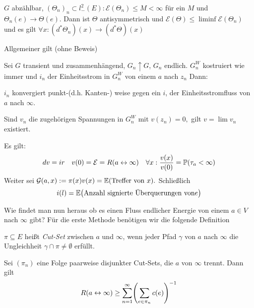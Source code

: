 \begin{uebung}
	$G$ abzählbar, $(\Theta_n)_n \subset l^2_-(E): \mathcal{E}(\Theta_n) \leq M < \infty$ für ein $M$ und $\Theta_n(e) \to \Theta(e)$. Dann ist $\Theta$ antisymmetrisch und $\mathcal{E}(\Theta) \leq \liminf \mathcal{E}(\Theta_n)$ und es gilt $ \forall x: (d^*\Theta_n)(x) \to (d^*\Theta)(x)$
\end{uebung}

Allgemeiner gilt (ohne Beweis)

\begin{satz}
	Sei $G$ transient und zusammenhängend, $G_n \uparrow G$, $G_n$ endlich. $G_n^W$ kostruiert wie immer und $i_n$ der Einheitsstrom in $G^W_n$ von einem $a$ nach $z_n$ Dann:
	
	$i_n$ konvergiert punkt-(d.h. Kanten-) weise gegen ein $i$, der Einheitsstromfluss von $a$ nach $\infty$.
	
	Sind $v_n$ die zugehörigen Spannungen in $G^W_n$ mit $v(z_n) = 0,$ gilt $v  = \lim v_n$ existiert.
	
	Es gilt:
	\begin{align}
	dv = ir && v(0) = \mathcal{E} = R(a \leftrightarrow \infty) && \forall x: \frac{v(x)}{v(0)} = \prop{\tau_a < \infty}
	\end{align}
	Weiter sei $\mathcal{G}(a,x) := \pi(x)v(x) = \EW{\text{Treffer von }x}.$ Schließlich 
	\begin{equation}
	i(l) = \EW{\text{Anzahl signierte Überquerungen von}e} 
	\end{equation}
	
\end{satz}
Wie findet man nun heraus ob es einen Fluss endlicher Energie von einem $a\in V$ nach $\infty$ gibt? Für die erste Methode benötigen wir die folgende Definition
\begin{definition}
	$\pi \subseteq E$ heißt \emph{Cut-Set} zwischen $a$ und $\infty$, wenn jeder Pfad $\gamma$ von $a$ nach $\infty$ die Ungleichheit $\gamma \cap \pi \neq \emptyset$ erfüllt.
\end{definition}

\begin{satz}
	\label{satz:Nash-Williams}
	Sei $(\pi_n)$ eine Folge paarweise disjunkter Cut-Sets, die $a$ von $\infty$ trennt. Dann gilt 
	\begin{align}
	R(a \leftrightarrow \infty) \geq \sum\limits_{n = 1}^{\infty}\enb{\sum\limits_{e \in \pi_n} c(e)}^{-1}
	\end{align}
\end{satz}

